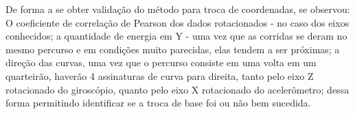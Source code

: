 De forma a se obter validação do método para troca de coordenadas, se observou: O coeficiente de correlação de Pearson dos dados rotacionados - no caso dos eixos conhecidos; a quantidade de energia em Y - uma vez que as corridas se deram no mesmo percurso e em condições muito parecidas, elas tendem a ser próximas; a direção das curvas, uma vez que o percurso consiste em uma volta em um quarteirão, haverão 4 assinaturas de curva para direita, tanto pelo eixo Z rotacionado do giroscópio, quanto pelo eixo X rotacionado do acelerômetro; dessa forma permitindo identificar se a troca de base foi ou não bem sucedida.


